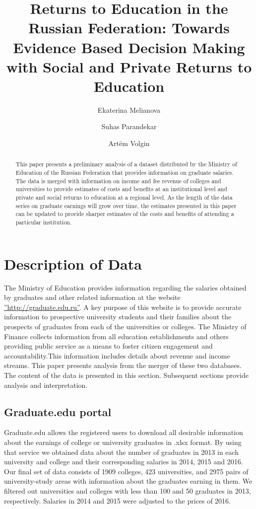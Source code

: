 \documentclass[alpha-refs]{wiley-article-05g}
\title{Returns to Education in the Russian Federation: Towards Evidence Based Decision Making with Social and Private Returns to Education}
\author[*]{Ekaterina Melianova}
\author[*]{\hspace{-1em}Suhas Parandekar}
\author[*]{\hspace{-1em}Art\"{e}m Volgin}
\affil[*]{Education Global Practice, Europe and Central Asia}
\begin{document}
\maketitle

\begin{abstract}
This paper presents a preliminary analysis of a dataset distributed by the Ministry of Education of the Russian Federation that provides information on graduate salaries. The data is merged with information on income and fee revenue of colleges and universities to provide estimates of costs and benefits at an institutional level and private and social returns to education at a regional level. As the length of the data series on graduate earnings will grow over time, the estimates presented in this paper can be updated to provide sharper estimates of the costs and benefits of attending a particular institution.

\end{abstract}

\section{Description of Data}

The Ministry of Education provides information regarding  the salaries obtained by graduates and other related information at the website \hyperref[graduate.edu]{''http://graduate.edu.ru''}. A key purpose of this website is to provide accurate information to prospective university students and their families about the prospects of graduates from each of the universities or colleges. The Ministry of Finance collects information from all education establishments and others providing public service as a means to foster citizen engagement and accountability.This information includes details about revenue and income streams. This paper presents analysis from the merger of these two databases. The content of the data is presented in this section. Subsequent sections provide analysis and interpretation.

\subsection{Graduate.edu portal}

Graduate.edu allows the registered users to download all desirable information about the earnings of college or university graduates in .xlsx format. By using that service we obtained data about the number of graduates in 2013 in each university and college and their corresponding salaries in 2014, 2015 and 2016.
Our final set of data consists of 1909 colleges, 423 universities, and 2975 pairs of university-study areas with information about the graduates earning in them. We filtered out universities and colleges with less than 100 and 50 graduates in 2013, respectively. Salaries in 2014 and 2015 were adjusted to the prices of 2016.
\end{document}
